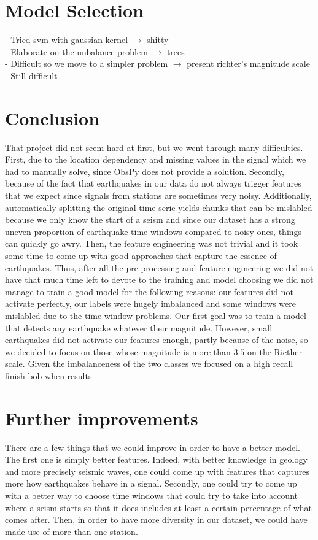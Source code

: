 \documentclass[10pt,conference,compsocconf]{IEEEtran}
\begin{document}
\section{Model Selection}
- Tried svm with gaussian kernel $\rightarrow$ shitty\\
- Elaborate on the unbalance problem $\rightarrow$ trees\\
- Difficult so we move to a simpler problem $\rightarrow$ present richter's magnitude scale\\
- Still difficult\\

\section{Conclusion}
That project did not seem hard at first, but we went through many difficulties. First, due to the location dependency and missing values in the signal which we had to manually solve, since ObsPy does not provide a solution. Secondly, because of the fact that earthquakes in our data do not always trigger features that we expect since signals from stations are sometimes very noisy. Additionally, automatically splitting the original time serie yields chunks that can be mislabled because we only know the start of a seism and since our dataset has a strong uneven proportion of earthquake time windows compared to noisy ones, things can quickly go awry. Then, the feature engineering was not trivial and it took some time to come up with good approaches that capture the essence of earthquakes.\newline
Thus, after all the pre-processing and feature engineering we did not have that much time left to devote to the training and model choosing we did not manage to train a good model for the following reasons: our features did not activate perfectly, our labels were hugely imbalanced and some windows were mislabled due to the time window problems. Our first goal was to train a model that detects any earthquake whatever their magnitude. However, small earthquakes did not activate our features enough, partly because of the noise, so we decided to focus on those whose magnitude is more than $3.5$ on the Ricther scale. Given the imbalanceness of the two classes we focused on a high recall finish bob when results \newline


\section{Further improvements}
There are a few things that we could improve in order to have a better model. The first one is simply better features. Indeed, with better knowledge in geology and more precisely seismic waves, one could come up with features that captures more how earthquakes behave in a signal. Secondly, one could try to come up with a better way to choose time windows that could try to take into account where a seism starts so that it does includes at least a certain percentage of what comes after. Then, in order to have more diversity in our dataset, we could have made use of more than one station.
\end{document}
